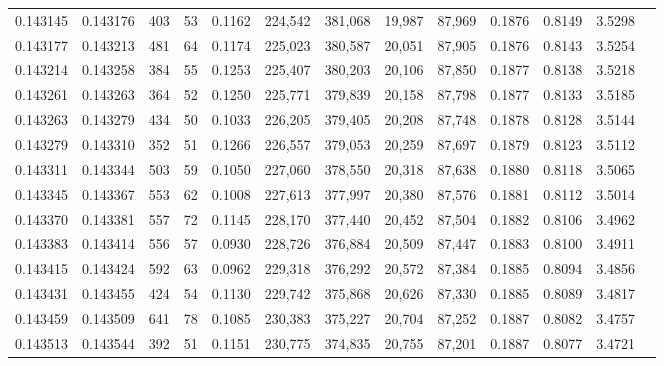 \begin{tabular}{rrrrrrrrrrrrr}
0.143145 & 0.143176 &   403 &  53 &                                     0.1162 & 224,542 & 381,068 &  19,987 &  87,969 & 0.1876 & 0.8149 & 3.5298 \\
0.143177 & 0.143213 &   481 &  64 &                                     0.1174 & 225,023 & 380,587 &  20,051 &  87,905 & 0.1876 & 0.8143 & 3.5254 \\
0.143214 & 0.143258 &   384 &  55 &                                     0.1253 & 225,407 & 380,203 &  20,106 &  87,850 & 0.1877 & 0.8138 & 3.5218 \\
0.143261 & 0.143263 &   364 &  52 &                                     0.1250 & 225,771 & 379,839 &  20,158 &  87,798 & 0.1877 & 0.8133 & 3.5185 \\
0.143263 & 0.143279 &   434 &  50 &                                     0.1033 & 226,205 & 379,405 &  20,208 &  87,748 & 0.1878 & 0.8128 & 3.5144 \\
0.143279 & 0.143310 &   352 &  51 &                                     0.1266 & 226,557 & 379,053 &  20,259 &  87,697 & 0.1879 & 0.8123 & 3.5112 \\
0.143311 & 0.143344 &   503 &  59 &                                     0.1050 & 227,060 & 378,550 &  20,318 &  87,638 & 0.1880 & 0.8118 & 3.5065 \\
0.143345 & 0.143367 &   553 &  62 &                                     0.1008 & 227,613 & 377,997 &  20,380 &  87,576 & 0.1881 & 0.8112 & 3.5014 \\
0.143370 & 0.143381 &   557 &  72 &                                     0.1145 & 228,170 & 377,440 &  20,452 &  87,504 & 0.1882 & 0.8106 & 3.4962 \\
0.143383 & 0.143414 &   556 &  57 &                                     0.0930 & 228,726 & 376,884 &  20,509 &  87,447 & 0.1883 & 0.8100 & 3.4911 \\
0.143415 & 0.143424 &   592 &  63 &                                     0.0962 & 229,318 & 376,292 &  20,572 &  87,384 & 0.1885 & 0.8094 & 3.4856 \\
0.143431 & 0.143455 &   424 &  54 &                                     0.1130 & 229,742 & 375,868 &  20,626 &  87,330 & 0.1885 & 0.8089 & 3.4817 \\
0.143459 & 0.143509 &   641 &  78 &                                     0.1085 & 230,383 & 375,227 &  20,704 &  87,252 & 0.1887 & 0.8082 & 3.4757 \\
0.143513 & 0.143544 &   392 &  51 &                                     0.1151 & 230,775 & 374,835 &  20,755 &  87,201 & 0.1887 & 0.8077 & 3.4721 \\

\end{tabular}
